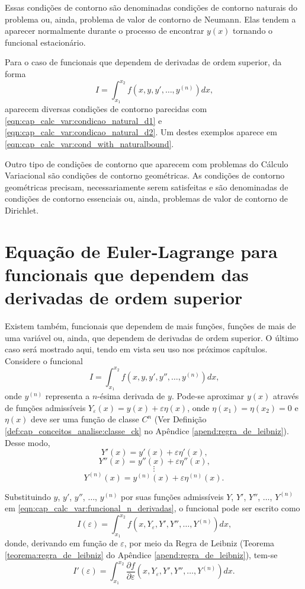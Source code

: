 \documentclass[
	12pt,				%
	openright,			%
    twoside,			%
	a4paper,			%
	english,			%
	french,				%
	spanish,			%
	brazil				%
	]{abntex2}
\numberwithin{lema}{chapter}
\numberwithin{teorema}{chapter}
\numberwithin{definicao}{chapter}
\numberwithin{exemplo}{chapter}
\numberwithin{figure}{chapter}
\begin{document}
Essas condições de contorno são denominadas condições de contorno naturais do problema ou, ainda, problema de valor de contorno de Neumann. Elas tendem a aparecer normalmente durante o processo de encontrar $y(x)$ tornando o funcional estacionário.

Para o caso de funcionais que dependem de derivadas de ordem superior, da forma
$$
	I=\int_{x_1}^{x_2} f(x, y, y', \dots, y^{(n)}) dx
	\text{,}
$$
aparecem diversas condições de contorno parecidas com \eqref{eqn:cap_calc_var:condicao_natural_d1} e \eqref{eqn:cap_calc_var:condicao_natural_d2}. Um destes exemplos aparece em \eqref{eqn:cap_calc_var:cond_with_naturalbound}.

Outro tipo de condições de contorno que aparecem com problemas do Cálculo Variacional são condições de contorno geométricas. As condições de contorno geométricas precisam, necessariamente serem satisfeitas e são denominadas de condições de contorno essenciais ou, ainda, problemas de valor de contorno de Dirichlet.

\section{Equação de Euler-Lagrange para funcionais que dependem das derivadas de ordem superior}
\label{sec:eq_euler_lagrange_superior}

Existem também, funcionais que dependem de mais funções, funções de mais de uma variável ou, ainda, que dependem de derivadas de ordem superior. O último caso será mostrado aqui, tendo em vista seu uso nos próximos capítulos. Considere o funcional
\begin{equation}
	\label{eqn:cap_calc_var:funcional_n_derivadas}
	I=\int_{x_1}^{x_2} f(x, y, y', y'', \dots, y^{(n)})dx
	\text{,}
\end{equation}
onde $y^{(n)}$ representa a $n$-ésima derivada de $y$. Pode-se aproximar $y(x)$ através de funções admissíveis $Y_{\varepsilon}(x)=y(x)+\varepsilon \eta (x)$, onde $\eta(x_1)=\eta(x_2)=0$ e $\eta(x)$ deve ser uma função de classe $C^n$ (Ver Definição \ref{def:cap_conceitos_analise:classe_ck} no Apêndice \ref{apend:regra_de_leibniz}). Desse modo,
$$
	Y'(x)=y'(x)+\varepsilon \eta ' (x)
	\text{,}
$$
$$
	Y''(x)=y''(x)+\varepsilon \eta '' (x)
	\text{,}
$$
$$
	\vdots
$$
$$
	Y^{(n)} (x)= y^{(n)}(x)+\varepsilon \eta^{(n)} (x)
	\text{.}
$$

Substituindo $y$, $y'$, $y''$, $\dots$, $y^{(n)}$ por suas funções admissíveis $Y$, $Y'$, $Y''$, $\dots$, $Y^{(n)}$ em \eqref{eqn:cap_calc_var:funcional_n_derivadas}, o funcional pode ser escrito como
$$
	I(\varepsilon) = \int_{x_1}^{x_2}
		f(x, Y_{\varepsilon}, Y', Y'', \dots, Y^{(n)})
		dx
	\text{,}
$$
donde, derivando em função de $\varepsilon$, por meio da Regra de Leibniz (Teorema \ref{teorema:regra_de_leibniz} do Apêndice \ref{apend:regra_de_leibniz}), tem-se
\begin{equation}
	\label{eqn:cap_calc_var:diff_func_n_derivadas_leibniz}
	I'(\varepsilon) = 
	\int_{x_1}^{x_2}
		\frac{\partial f}{\partial \varepsilon}
		(x, Y_{\varepsilon}, Y', Y'', \dots, Y^{(n)})
		dx
	\text{.}
\end{equation}
\end{document}
